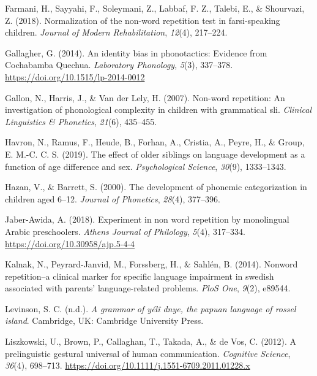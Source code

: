 \documentclass[english,,man,floatsintext]{apa6}
\begin{document}
\leavevmode\hypertarget{ref-farmani2018normalization}{}%
Farmani, H., Sayyahi, F., Soleymani, Z., Labbaf, F. Z., Talebi, E., \& Shourvazi, Z. (2018). Normalization of the non-word repetition test in farsi-speaking children. \emph{Journal of Modern Rehabilitation}, \emph{12}(4), 217--224.

\leavevmode\hypertarget{ref-gallagher2014identity}{}%
Gallagher, G. (2014). An identity bias in phonotactics: Evidence from Cochabamba Quechua. \emph{Laboratory Phonology}, \emph{5}(3), 337--378. \url{https://doi.org/10.1515/lp-2014-0012}

\leavevmode\hypertarget{ref-gallon2007non}{}%
Gallon, N., Harris, J., \& Van der Lely, H. (2007). Non-word repetition: An investigation of phonological complexity in children with grammatical sli. \emph{Clinical Linguistics \& Phonetics}, \emph{21}(6), 435--455.

\leavevmode\hypertarget{ref-havron2019effect}{}%
Havron, N., Ramus, F., Heude, B., Forhan, A., Cristia, A., Peyre, H., \& Group, E. M.-C. C. S. (2019). The effect of older siblings on language development as a function of age difference and sex. \emph{Psychological Science}, \emph{30}(9), 1333--1343.

\leavevmode\hypertarget{ref-hazan2000development}{}%
Hazan, V., \& Barrett, S. (2000). The development of phonemic categorization in children aged 6--12. \emph{Journal of Phonetics}, \emph{28}(4), 377--396.

\leavevmode\hypertarget{ref-jabere2018xperiment}{}%
Jaber-Awida, A. (2018). Experiment in non word repetition by monolingual Arabic preschoolers. \emph{Athens Journal of Philology}, \emph{5}(4), 317--334. \url{https://doi.org/10.30958/ajp.5-4-4}

\leavevmode\hypertarget{ref-kalnak2014nonword}{}%
Kalnak, N., Peyrard-Janvid, M., Forssberg, H., \& Sahlén, B. (2014). Nonword repetition--a clinical marker for specific language impairment in swedish associated with parents' language-related problems. \emph{PloS One}, \emph{9}(2), e89544.

\leavevmode\hypertarget{ref-levinsoninprepydgrammar}{}%
Levinson, S. C. (n.d.). \emph{A grammar of yélî dnye, the papuan language of rossel island}. Cambridge, UK: Cambridge University Press.

\leavevmode\hypertarget{ref-liszkowski2012prelinguistic}{}%
Liszkowski, U., Brown, P., Callaghan, T., Takada, A., \& de Vos, C. (2012). A prelinguistic gestural universal of human communication. \emph{Cognitive Science}, \emph{36}(4), 698--713. \url{https://doi.org/10.1111/j.1551-6709.2011.01228.x}
\end{document}
